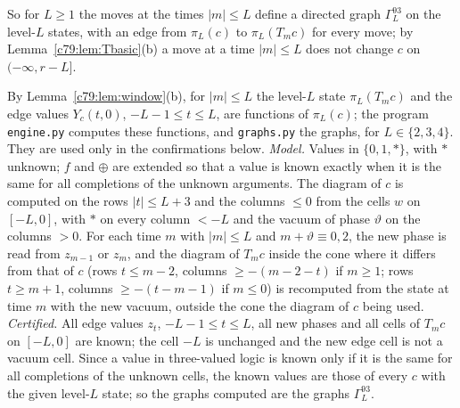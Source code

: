 So for $L\ge1$ the moves at the times $|m|\le L$ define a directed graph $\Gamma^{93}_L$ on the level-$L$ states, with an edge from $\pi_L(c)$ to $\pi_L(T_mc)$ for every move; by Lemma~\ref{c79:lem:Tbasic}(b) a move at a time $|m|\le L$ does not change $c$ on $(-\infty,r-L]$.

By Lemma~\ref{c79:lem:window}(b), for $|m|\le L$ the level-$L$ state $\pi_L(T_mc)$ and the edge values $Y_c(t,0)$, $-L-1\le t\le L$, are functions of $\pi_L(c)$; the program \texttt{engine.py} computes these functions, and \texttt{graphs.py} the graphs, for $L\in\{2,3,4\}$. They are used only in the confirmations below.
\emph{Model.} Values in $\{0,1,\ast\}$, with $\ast$ unknown; $f$ and $\oplus$ are extended so that a value is known exactly when it is the same for all completions of the unknown arguments. The diagram of $c$ is computed on the rows $|t|\le L+3$ and the columns $\le0$ from the cells $w$ on $[-L,0]$, with $\ast$ on every column $<-L$ and the vacuum of phase $\vartheta$ on the columns $>0$. For each time $m$ with $|m|\le L$ and $m+\vartheta\equiv0,2$, the new phase is read from $z_{m-1}$ or $z_m$, and the diagram of $T_mc$ inside the cone where it differs from that of $c$ (rows $t\le m-2$, columns $\ge-(m-2-t)$ if $m\ge1$; rows $t\ge m+1$, columns $\ge-(t-m-1)$ if $m\le0$) is recomputed from the state at time $m$ with the new vacuum, outside the cone the diagram of $c$ being used.
\emph{Certified.} All edge values $z_t$, $-L-1\le t\le L$, all new phases and all cells of $T_mc$ on $[-L,0]$ are known; the cell $-L$ is unchanged and the new edge cell is not a vacuum cell. Since a value in three-valued logic is known only if it is the same for all completions of the unknown cells, the known values are those of every $c$ with the given level-$L$ state; so the graphs computed are the graphs $\Gamma^{93}_L$.

